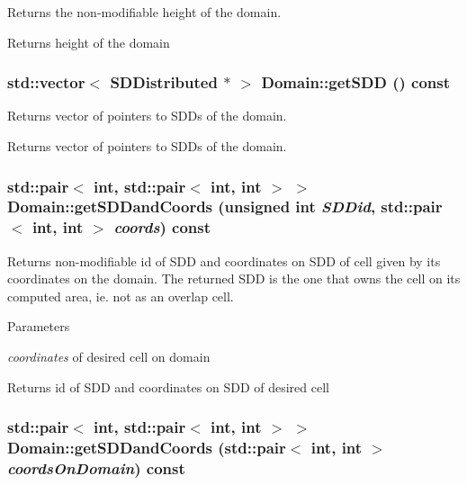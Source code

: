 Returns the non-\/modifiable height of the domain. \begin{DoxyReturn}{Returns}
height of the domain 
\end{DoxyReturn}
\hypertarget{classDomain_abdf41aefa7cf64674bce2d4a065fa372}{
\subsubsection[{getSDD}]{\setlength{\rightskip}{0pt plus 5cm}std::vector$<$ {\bf SDDistributed} $\ast$ $>$ Domain::getSDD () const}}
\label{classDomain_abdf41aefa7cf64674bce2d4a065fa372}


Returns vector of pointers to SDDs of the domain. \begin{DoxyReturn}{Returns}
vector of pointers to SDDs of the domain. 
\end{DoxyReturn}
\hypertarget{classDomain_afc46286fa167e7a2ebccacced8d31c34}{
\subsubsection[{getSDDandCoords}]{\setlength{\rightskip}{0pt plus 5cm}std::pair$<$ int, std::pair$<$ int, int $>$ $>$ Domain::getSDDandCoords (unsigned int {\em SDDid}, \/  std::pair$<$ int, int $>$ {\em coords}) const}}
\label{classDomain_afc46286fa167e7a2ebccacced8d31c34}


Returns non-\/modifiable id of SDD and coordinates on SDD of cell given by its coordinates on the domain. The returned SDD is the one that owns the cell on its computed area, ie. not as an overlap cell.


\begin{DoxyParams}{Parameters}
\item[{\em coordinates}]of desired cell on domain\end{DoxyParams}
\begin{DoxyReturn}{Returns}
id of SDD and coordinates on SDD of desired cell 
\end{DoxyReturn}
\hypertarget{classDomain_accb471dd6649bd38403cd28a2bbccd79}{
\subsubsection[{getSDDandCoords}]{\setlength{\rightskip}{0pt plus 5cm}std::pair$<$ int, std::pair$<$ int, int $>$ $>$ Domain::getSDDandCoords (std::pair$<$ int, int $>$ {\em coordsOnDomain}) const}}
\label{classDomain_accb471dd6649bd38403cd28a2bbccd79}



